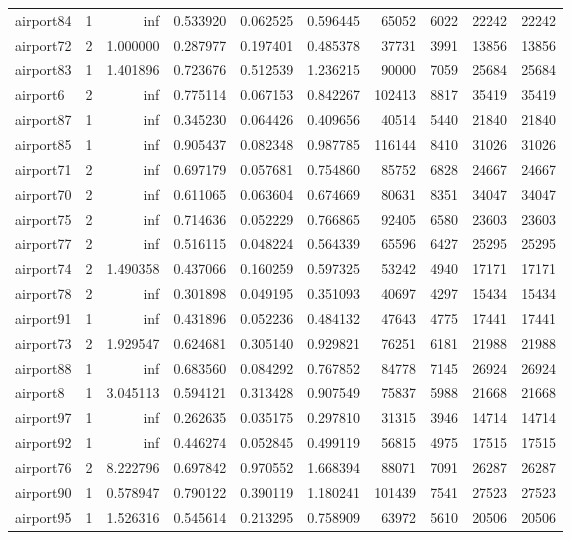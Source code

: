 \documentclass[../../../thesis.tex]{subfiles}
\begin{document}
\begin{longtable}{|l|r|r|r|r|r|r|r|r|r|}
airport84 & 1 & inf & 0.533920 & 0.062525 & 0.596445 & 65052 & 6022 & 22242 & 22242 \\
airport72 & 2 & 1.000000 & 0.287977 & 0.197401 & 0.485378 & 37731 & 3991 & 13856 & 13856 \\
airport83 & 1 & 1.401896 & 0.723676 & 0.512539 & 1.236215 & 90000 & 7059 & 25684 & 25684 \\
airport6 & 2 & inf & 0.775114 & 0.067153 & 0.842267 & 102413 & 8817 & 35419 & 35419 \\
airport87 & 1 & inf & 0.345230 & 0.064426 & 0.409656 & 40514 & 5440 & 21840 & 21840 \\
airport85 & 1 & inf & 0.905437 & 0.082348 & 0.987785 & 116144 & 8410 & 31026 & 31026 \\
airport71 & 2 & inf & 0.697179 & 0.057681 & 0.754860 & 85752 & 6828 & 24667 & 24667 \\
airport70 & 2 & inf & 0.611065 & 0.063604 & 0.674669 & 80631 & 8351 & 34047 & 34047 \\
airport75 & 2 & inf & 0.714636 & 0.052229 & 0.766865 & 92405 & 6580 & 23603 & 23603 \\
airport77 & 2 & inf & 0.516115 & 0.048224 & 0.564339 & 65596 & 6427 & 25295 & 25295 \\
airport74 & 2 & 1.490358 & 0.437066 & 0.160259 & 0.597325 & 53242 & 4940 & 17171 & 17171 \\
airport78 & 2 & inf & 0.301898 & 0.049195 & 0.351093 & 40697 & 4297 & 15434 & 15434 \\
airport91 & 1 & inf & 0.431896 & 0.052236 & 0.484132 & 47643 & 4775 & 17441 & 17441 \\
airport73 & 2 & 1.929547 & 0.624681 & 0.305140 & 0.929821 & 76251 & 6181 & 21988 & 21988 \\
airport88 & 1 & inf & 0.683560 & 0.084292 & 0.767852 & 84778 & 7145 & 26924 & 26924 \\
airport8 & 1 & 3.045113 & 0.594121 & 0.313428 & 0.907549 & 75837 & 5988 & 21668 & 21668 \\
airport97 & 1 & inf & 0.262635 & 0.035175 & 0.297810 & 31315 & 3946 & 14714 & 14714 \\
airport92 & 1 & inf & 0.446274 & 0.052845 & 0.499119 & 56815 & 4975 & 17515 & 17515 \\
airport76 & 2 & 8.222796 & 0.697842 & 0.970552 & 1.668394 & 88071 & 7091 & 26287 & 26287 \\
airport90 & 1 & 0.578947 & 0.790122 & 0.390119 & 1.180241 & 101439 & 7541 & 27523 & 27523 \\
airport95 & 1 & 1.526316 & 0.545614 & 0.213295 & 0.758909 & 63972 & 5610 & 20506 & 20506 \\

\end{longtable}
\end{document}
